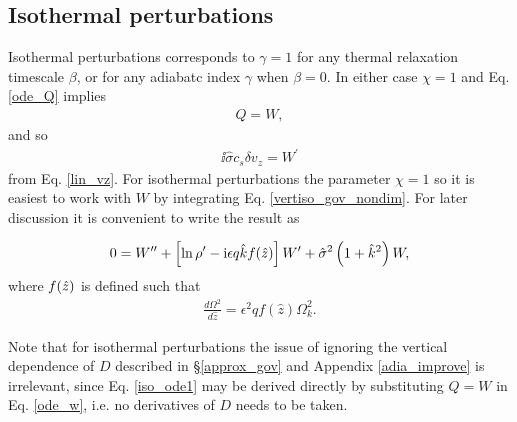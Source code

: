 \subsection{Isothermal perturbations}\label{iso_discuss}
Isothermal perturbations corresponds to $\gamma=1$ for any thermal
relaxation timescale $\beta$, or for any adiabatc index $\gamma$ when
$\beta=0$. In either case $\chi=1$ and Eq. \ref{ode_Q} implies 
\begin{align}
  Q = W, 
\end{align}
 and so 
 \begin{align}
   \ii\hat{\sigma}c_s\delta v_z = W^\prime
 \end{align}
from Eq. \ref{lin_vz}. For isothermal perturbations 
the parameter $\chi=1$ so it is easiest to work with
$W$ by integrating Eq. \ref{vertiso_gov_nondim}. For later discussion
it is convenient to write the result as 

\begin{align}
  0 = W^{\prime\prime} + \left[\ln\rho^\prime - \mathrm{i} \epsilon q \hat{k}
    f(\hat{z})\right]W^\prime + \hat{\sigma}^2\left(1+\hat{k}^2\right)W,\label{iso_ode1}
\end{align}
where $f(\hat{z})$ is defined such that
\begin{align}\label{fz_shear}
  \frac{d\Omega^2}{d\hat{z}} = \epsilon^2q f(\hat{z})\Omega_k^2.
\end{align}


Note that for isothermal perturbations the issue of ignoring the
vertical dependence of $D$ described in \S\ref{approx_gov} and Appendix
\ref{adia_improve} is irrelevant, since
Eq. \ref{iso_ode1} may be derived directly by substituting $Q=W$ in
Eq. \ref{ode_w}, i.e. no derivatives of $D$ needs to be taken. 

